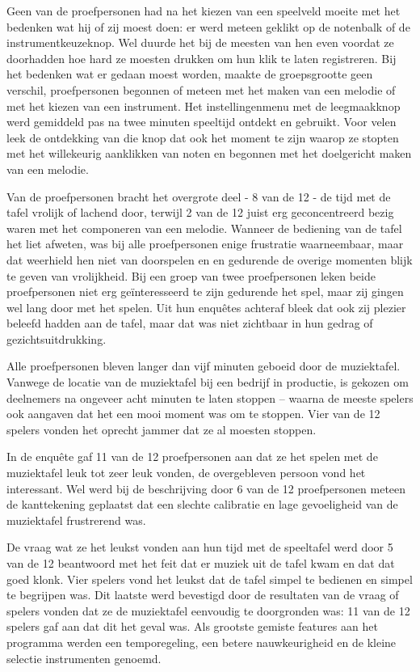 \documentclass{acm}
\begin{document}
Geen van de proefpersonen had na het kiezen van een speelveld moeite met het bedenken wat hij of zij moest doen: er werd meteen geklikt op de notenbalk of de instrumentkeuzeknop. Wel duurde het bij de meesten van hen even voordat ze doorhadden hoe hard ze moesten drukken om hun klik te laten registreren. Bij het bedenken wat er gedaan moest worden, maakte de groepsgrootte geen verschil, proefpersonen begonnen of meteen met het maken van een melodie of met het kiezen van een instrument. Het instellingenmenu met de leegmaakknop werd gemiddeld pas na twee minuten speeltijd ontdekt en gebruikt. Voor velen leek de ontdekking van die knop dat ook het moment te zijn waarop ze stopten met het willekeurig aanklikken van noten en begonnen met het doelgericht maken van een melodie.

Van de proefpersonen bracht het overgrote deel - 8 van de 12 - de tijd met de tafel vrolijk of lachend door, terwijl 2 van de 12 juist erg geconcentreerd bezig waren met het componeren van een melodie. Wanneer de bediening van de tafel het liet afweten, was bij alle proefpersonen enige frustratie waarneembaar, maar dat weerhield hen niet van doorspelen en en gedurende de overige momenten blijk te geven van vrolijkheid. Bij een groep van twee proefpersonen leken beide proefpersonen niet erg ge\"interesseerd te zijn gedurende het spel, maar zij gingen wel lang door met het spelen. Uit hun enquêtes achteraf bleek dat ook zij plezier beleefd hadden aan de tafel, maar dat was niet zichtbaar in hun gedrag of gezichtsuitdrukking.

Alle proefpersonen bleven langer dan vijf minuten geboeid door de muziektafel. Vanwege de locatie van de muziektafel bij een bedrijf in productie, is gekozen om deelnemers na ongeveer acht minuten te laten stoppen -- waarna de meeste spelers ook aangaven dat het een mooi moment was om te stoppen. Vier van de 12 spelers vonden het oprecht jammer dat ze al moesten stoppen.

In de enquête gaf 11 van de 12 proefpersonen aan dat ze het spelen met de muziektafel leuk tot zeer leuk vonden, de overgebleven persoon vond het interessant. Wel werd bij de beschrijving door 6 van de 12 proefpersonen meteen de kanttekening geplaatst dat een slechte calibratie en lage gevoeligheid van de muziektafel frustrerend was.

De vraag wat ze het leukst vonden aan hun tijd met de speeltafel werd door 5 van de 12 beantwoord met het feit dat er muziek uit de tafel kwam en dat dat goed klonk. Vier spelers vond het leukst dat de tafel simpel te bedienen en simpel te begrijpen was. Dit laatste werd bevestigd door de resultaten van de vraag of spelers vonden dat ze de muziektafel eenvoudig te doorgronden was: 11 van de 12 spelers gaf aan dat dit het geval was. Als grootste gemiste features aan het programma werden een temporegeling, een betere nauwkeurigheid en de kleine selectie instrumenten genoemd.
\end{document}

